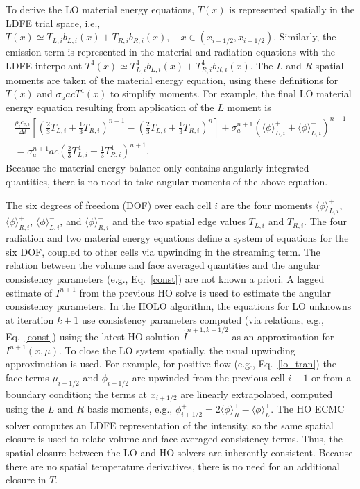 \documentclass{mc2013}
\newcommand{\mom}[1]{\langle #1 \rangle}
\newcommand{\ir}{{i+1/2}}
\begin{document}
To derive the LO material energy equations, $T(x)$ is represented spatially in
the LDFE trial space, i.e.,
$ T(x) \simeq T_{L,i} b_{L,i}(x) + T_{R,i} b_{R,i}(x),\quad x\in(x_{i-1/2},x_\ir)$.
Similarly, the emission term is represented in the material and radiation equations with the LDFE
interpolant $T^4(x)\simeq T_{L,i}^4 b_{L,i}(x) + T_{R,i}^4 b_{R,i}(x)$.   The $L$ and $R$ spatial moments are taken of the material
energy equation, using these definitions for $T(x)$ and $\sigma_a a c T^4(x)$ to simplify moments. For example, the final LO material energy
 equation resulting from application of the $L$ moment is
 \begin{multline}\label{lo_mat_dis}
     \frac{\rho_i c_{v,i}}{\Delta t}\left[ \left(\frac{2}{3}T_{L,i} + \frac{1}{3}T_{R,i}
        \right)^{n+1} - \left(\frac{2}{3}T_{L,i} + \frac{1}{3}T_{R,i}
    \right)^{n} \right]  + \sigma_a^{n+1} \left( \mom{\phi}_{L,i}^+ +
    \mom{\phi}_{L,i}^- \right)^{n+1} \\ = \sigma_a^{n+1}a c
\left( \frac{2}{3} T_{L,i}^4 + \frac{1}{3}T_{R,i}^4
        \right)^{n+1}.
\end{multline}
Because the material energy balance
 only contains angularly integrated quantities, there is no need to take angular
 moments of the above equation.  

\label{sec:closure}

The six degrees of freedom (DOF) over each cell $i$ are the four moments $\mom{\phi}_{L,i}^+$,
$\mom{\phi}_{R,i}^+$, $\mom{\phi}_{L,i}^-$, and $\mom{\phi}_{R,i}^-$ and the two
spatial edge values $T_{L,i}$ and $T_{R,i}$. The four radiation and two material
energy equations define a system of equations for the six DOF, coupled to other cells
via upwinding in the streaming term.
The relation between the volume and face averaged quantities and the angular consistency parameters (e.g., Eq.~\eqref{const}) are not known a priori. 
A lagged estimate of $I^{n+1}$ from the previous HO solve is
used to estimate the angular consistency parameters. In the HOLO algorithm, the equations for LO unknowns at iteration $k+1$ use consistency parameters
computed (via relations, e.g., Eq.~\eqref{const}) using the latest HO solution $\tilde{I}^{n+1,k+1/2}$
as an approximation for $I^{n+1}(x,\mu)$. To close the LO system spatially, the usual upwinding
approximation is used.  For example, for positive flow (e.g., Eq.~\eqref{lo_tran}) the face terms $\mu_{i-1/2}$ and $\phi_{i-1/2}$
are upwinded from the previous cell $i-1$ or from a boundary condition; the terms
at $x_{i+1/2}$ are linearly extrapolated, computed using the $L$ and $R$ basis
moments, e.g., $\phi^+_{i+1/2} = 2\mom{\phi}_R^+ - \mom{\phi}_L^+$. 
The HO ECMC solver computes an LDFE representation of the intensity, so the same spatial closure is used to relate volume and face averaged consistency terms.  Thus, the spatial closure between the LO and HO solvers are inherently
consistent.  Because there are no
spatial temperature derivatives, there is no need for an
additional closure in $T$. 
\end{document}
